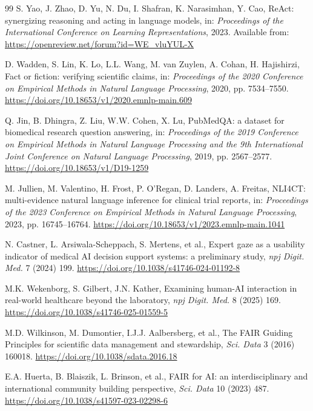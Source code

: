 \documentclass[11pt,a4paper]{article}
\begin{document}
\begin{thebibliography}{99}
S. Yao, J. Zhao, D. Yu, N. Du, I. Shafran, K. Narasimhan, Y. Cao, ReAct: synergizing reasoning and acting in language models, in: \emph{Proceedings of the International Conference on Learning Representations}, 2023. Available from: \url{https://openreview.net/forum?id=WE_vluYUL-X}

D. Wadden, S. Lin, K. Lo, L.L. Wang, M. van Zuylen, A. Cohan, H. Hajishirzi, Fact or fiction: verifying scientific claims, in: \emph{Proceedings of the 2020 Conference on Empirical Methods in Natural Language Processing}, 2020, pp. 7534--7550. \url{https://doi.org/10.18653/v1/2020.emnlp-main.609}

Q. Jin, B. Dhingra, Z. Liu, W.W. Cohen, X. Lu, PubMedQA: a dataset for biomedical research question answering, in: \emph{Proceedings of the 2019 Conference on Empirical Methods in Natural Language Processing and the 9th International Joint Conference on Natural Language Processing}, 2019, pp. 2567--2577. \url{https://doi.org/10.18653/v1/D19-1259}

M. Jullien, M. Valentino, H. Frost, P. O'Regan, D. Landers, A. Freitas, NLI4CT: multi-evidence natural language inference for clinical trial reports, in: \emph{Proceedings of the 2023 Conference on Empirical Methods in Natural Language Processing}, 2023, pp. 16745--16764. \url{https://doi.org/10.18653/v1/2023.emnlp-main.1041}

N. Castner, L. Arsiwala-Scheppach, S. Mertens, et al., Expert gaze as a usability indicator of medical AI decision support systems: a preliminary study, \emph{npj Digit. Med.} 7 (2024) 199. \url{https://doi.org/10.1038/s41746-024-01192-8}

M.K. Wekenborg, S. Gilbert, J.N. Kather, Examining human-AI interaction in real-world healthcare beyond the laboratory, \emph{npj Digit. Med.} 8 (2025) 169. \url{https://doi.org/10.1038/s41746-025-01559-5}

M.D. Wilkinson, M. Dumontier, I.J.J. Aalbersberg, et al., The FAIR Guiding Principles for scientific data management and stewardship, \emph{Sci. Data} 3 (2016) 160018. \url{https://doi.org/10.1038/sdata.2016.18}

E.A. Huerta, B. Blaiszik, L. Brinson, et al., FAIR for AI: an interdisciplinary and international community building perspective, \emph{Sci. Data} 10 (2023) 487. \url{https://doi.org/10.1038/s41597-023-02298-6}


\end{thebibliography}
\end{document}
